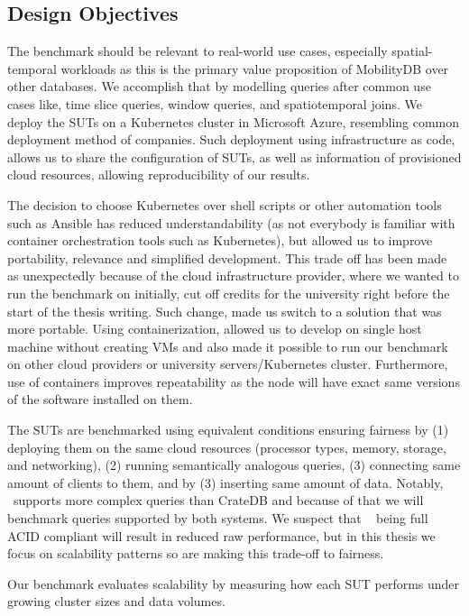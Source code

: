 \subsection{Design Objectives}
The benchmark should be relevant to real-world use cases, especially spatial-temporal workloads as this is the primary value proposition of MobilityDB over other databases.
We accomplish that by modelling queries after common use cases like, time slice queries, window queries, and spatiotemporal joins.
We deploy the SUTs on a Kubernetes cluster in Microsoft Azure, resembling common deployment method of companies.
Such deployment using infrastructure as code, allows us to share the configuration of SUTs, as well as information of provisioned cloud resources, allowing reproducibility of our results.

The decision to choose Kubernetes over shell scripts or other automation tools such as Ansible has reduced understandability (as not everybody is familiar with container orchestration tools such as Kubernetes), but allowed us to improve portability, relevance and simplified development.
This trade off has been made as unexpectedly because of the cloud infrastructure provider, where we wanted to run the benchmark on initially, cut off credits for the university right before the start of the thesis writing.
Such change, made us switch to a solution that was more portable.
Using containerization, allowed us to develop on single host machine without creating VMs and also made it possible to run our benchmark on other cloud providers or university servers/Kubernetes cluster.
Furthermore, use of containers improves repeatability as the node will have exact same versions of the software installed on them.

The SUTs are benchmarked using equivalent conditions ensuring fairness by
(1) deploying them on the same cloud resources (processor types, memory, storage, and networking),
(2) running semantically analogous queries,
(3) connecting same amount of clients to them, and by
(3) inserting same amount of data.
Notably, \mobilitydbc~supports more complex queries than CrateDB and because of that we will benchmark queries supported by both systems.
We suspect that \mobilitydbc~ being full ACID compliant will result in reduced raw performance, but in this thesis we focus on scalability patterns so are making this trade-off to fairness.

Our benchmark evaluates scalability by measuring how each SUT performs under growing cluster sizes and data volumes.

